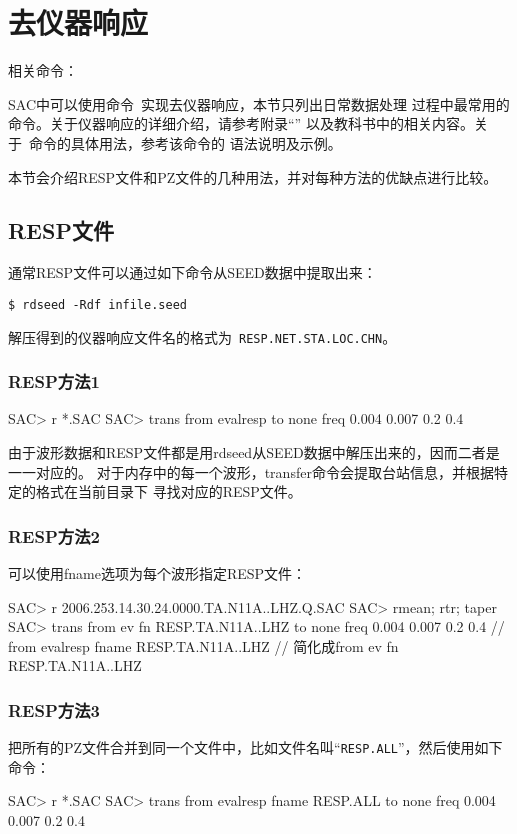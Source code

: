 \section{去仪器响应}
\label{sec:instrument-response}
相关命令：

SAC中可以使用命令~实现去仪器响应，本节只列出日常数据处理
过程中最常用的命令。关于仪器响应的详细介绍，请参考附录``''
以及教科书中的相关内容。关于~命令的具体用法，参考该命令的
语法说明及示例。

本节会介绍RESP文件和PZ文件的几种用法，并对每种方法的优缺点进行比较。
\subsection{RESP文件}
通常RESP文件可以通过如下命令从SEED数据中提取出来：
\begin{verbatim}
$ rdseed -Rdf infile.seed
\end{verbatim}
解压得到的仪器响应文件名的格式为~\verb+RESP.NET.STA.LOC.CHN+。

\subsubsection{RESP方法1}
\begin{SACCode}
SAC> r *.SAC
SAC> trans from evalresp to none freq 0.004 0.007 0.2 0.4
\end{SACCode}
由于波形数据和RESP文件都是用rdseed从SEED数据中解压出来的，因而二者是一一对应的。
对于内存中的每一个波形，transfer命令会提取台站信息，并根据特定的格式在当前目录下
寻找对应的RESP文件。

\subsubsection{RESP方法2}
可以使用fname选项为每个波形指定RESP文件：
\begin{SACCode}
SAC> r 2006.253.14.30.24.0000.TA.N11A..LHZ.Q.SAC
SAC> rmean; rtr; taper
SAC> trans from ev fn RESP.TA.N11A..LHZ to none freq 0.004 0.007 0.2 0.4
    // from evalresp fname RESP.TA.N11A..LHZ
    // 简化成from ev fn RESP.TA.N11A..LHZ
\end{SACCode}

\subsubsection{RESP方法3}
把所有的PZ文件合并到同一个文件中，比如文件名叫``\verb+RESP.ALL+''，然后使用如下命令：
\begin{SACCode}
SAC> r *.SAC
SAC> trans from evalresp fname RESP.ALL to none freq 0.004 0.007 0.2 0.4
\end{SACCode}

